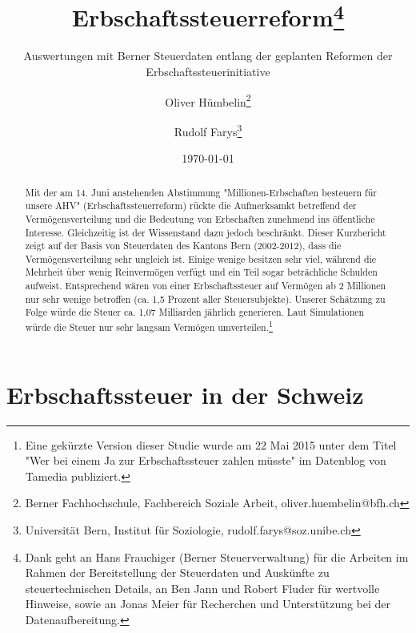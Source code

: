 \documentclass[a4paper, 12pt,liststotoc]{scrartcl}
\numberwithin{equation}{section}
\begin{document}
\title{Erbschaftssteuerreform\thanks{Dank geht an Hans Frauchiger (Berner
  Steuerverwaltung) für die Arbeiten im Rahmen der Bereitstellung der Steuerdaten und Auskünfte zu steuertechnischen Details, an Ben Jann und
  Robert Fluder für wertvolle Hinweise, sowie an Jonas Meier für
  Recherchen und Unterstützung bei der Datenaufbereitung.}}
\subtitle{Auswertungen mit Berner Steuerdaten entlang der geplanten Reformen der
Erbschaftssteuerinitiative}
\author{Oliver Hümbelin\thanks{Berner Fachhochschule, Fachbereich Soziale Arbeit, oliver.huembelin@bfh.ch} \and Rudolf Farys\thanks{Universität Bern, Institut für Soziologie, rudolf.farys@soz.unibe.ch}}
\date{\today}
\maketitle
\newpage

\begin{abstract}
Mit der am 14. Juni anstehenden Abstimmung "Millionen-Erbschaften besteuern für unsere AHV" (Erbschaftssteuerreform) rückte die Aufmerksamkt betreffend der Vermögensverteilung und die Bedeutung von Erbschaften zunehmend ins öffentliche Interesse. Gleichzeitig ist der Wissenstand dazu jedoch beschränkt. Dieser Kurzbericht zeigt auf der Basis von Steuerdaten des Kantons Bern (2002-2012), dass die Vermögensverteilung sehr ungleich ist. Einige wenige besitzen sehr viel, während die Mehrheit über wenig Reinvermögen verfügt und ein Teil sogar beträchliche Schulden aufweist. Entsprechend wären von einer Erbschaftssteuer auf Vermögen ab 2 Millionen nur sehr wenige betroffen (ca. 1,5 Prozent aller Steuersubjekte). Unserer Schätzung zu Folge würde die Steuer ca. 1,07 Milliarden jährlich generieren. Laut Simulationen würde die Steuer nur sehr langsam Vermögen umverteilen.\footnote{Eine gekürzte Version dieser Studie wurde am 22 Mai 2015 unter dem Titel "Wer bei einem Ja zur Erbschaftssteuer zahlen müsste" im Datenblog von Tamedia publiziert.}
\end{abstract}
\newpage

\tableofcontents
\newpage

\section{Erbschaftssteuer in der
Schweiz}\label{erbschaftssteuer-in-der-schweiz}
\end{document}
